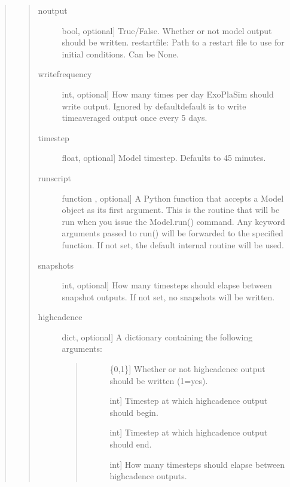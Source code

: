 \documentclass[letterpaper,10pt,english]{sphinxmanual}
\begin{document}
\begin{fulllineitems}
\begin{fulllineitems}
\begin{quote}
\begin{quote}
\begin{description}
\item[{noutput}] \leavevmode{[}bool, optional{]}
True/False. Whether or not model output should be written.
restartfile: Path to a restart file to use for initial conditions. Can be None.

\item[{writefrequency}] \leavevmode{[}int, optional{]}
How many times per day ExoPlaSim should write output. Ignored by
default\textendash{}default is to write time\sphinxhyphen{}averaged output once every 5 days.

\item[{timestep}] \leavevmode{[}float, optional{]}
Model timestep. Defaults to 45 minutes.

\item[{runscript}] \leavevmode{[}function , optional{]}
A Python function that accepts a Model object as its first argument. This
is the routine that will be run when you issue the Model.run() command.
Any keyword arguments passed to run() will be forwarded to the specified
function. If not set, the default internal routine will be used.

\item[{snapshots}] \leavevmode{[}int, optional{]}
How many timesteps should elapse between snapshot outputs. If not set,
no snapshots will be written.

\item[{highcadence}] \leavevmode{[}dict, optional{]}
A dictionary containing the following arguments:
\begin{quote}
\begin{description}
\item[{}] \leavevmode{[}\{0,1\}{]}
Whether or not high\sphinxhyphen{}cadence output should be written (1=yes).

\item[{}] \leavevmode{[}int{]}
Timestep at which high\sphinxhyphen{}cadence output should begin.

\item[{}] \leavevmode{[}int{]}
Timestep at which high\sphinxhyphen{}cadence output should end.

\item[{}] \leavevmode{[}int{]}
How many timesteps should elapse between high\sphinxhyphen{}cadence outputs.


\end{description}
\end{quote}
\end{description}
\end{quote}
\end{quote}
\end{fulllineitems}
\end{fulllineitems}
\end{document}
